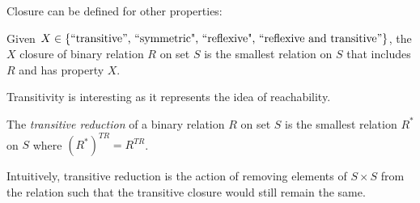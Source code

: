 Closure can be defined for other properties:

\begin{definition}
    Given \(X\in\{\text{``transitive'', ``symmetric", ``reflexive", ``reflexive and transitive''}\}\), the \(X\) closure of binary relation \(R\) 
    on set \(S\) is the smallest relation on \(S\) that includes \(R\) and has property \(X\).
\end{definition}

Transitivity is interesting as it represents the idea of reachability. 

\bigskip
\begin{definition}
    The \emph{transitive reduction} of a binary relation \(R\) on set \(S\) is the smallest relation \(R^*\) on \(S\) where \((R^*)^{TR}=R^{TR}\).
\end{definition}

Intuitively, transitive reduction is the action of removing elements of \(S\times S\) from the relation such that the transitive closure would still remain the same. 

